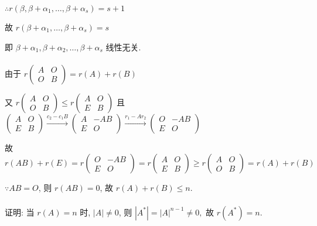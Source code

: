 		 \( \therefore r(\beta, \beta+\alpha_{1}, \dots, \beta+\alpha_{s}) = s+1 \)

		 故 \( r(\beta+\alpha_{1}, \dots, \beta+\alpha_{s}) = s \)

		 即 \( \beta+\alpha_{1}, \beta+\alpha_{2}, \dots, \beta+\alpha_{s} \) 线性无关.


	 \paragraph{} %
		 由于 \( r\begin{pmatrix}
			 A & O \\
			 O & B
		 \end{pmatrix} = r(A)+r(B) \)

		 又 \( r\begin{pmatrix}
			 A & O \\
			 O & B
		 \end{pmatrix} \leq r\begin{pmatrix}
			 A & O \\
			 E & B
		 \end{pmatrix} \) 且 \( \begin{pmatrix}
			 A & O \\
			 E & B
		 \end{pmatrix} \xrightarrow{c_2-c_1B} \begin{pmatrix}
			 A & -AB \\
			 E & O
		 \end{pmatrix} \xrightarrow{r_{1}-Ar_{2}} \begin{pmatrix}
			 O & -AB \\
			 E & O
		 \end{pmatrix} \)

		 故 \( r(AB)+r(E) = r\begin{pmatrix}
			 O & -AB \\
			 E & O
		 \end{pmatrix} = r\begin{pmatrix}
			 A & O \\
			 E & B
		 \end{pmatrix} \geq r\begin{pmatrix}
			 A & O \\
			 O & B
		 \end{pmatrix} = r(A)+r(B) \)

		 \( \because AB = O \), 则 \( r(AB) = 0 \), 故 \( r(A)+r(B) \leq n \).


	 \paragraph{} %
		 证明: 当 \( r(A) = n \) 时, \( |A| \neq 0 \), 则 \( |A^{*}| = |A|^{n-1} \neq 0, \text{ 故 } r(A^{*}) = n. \)

